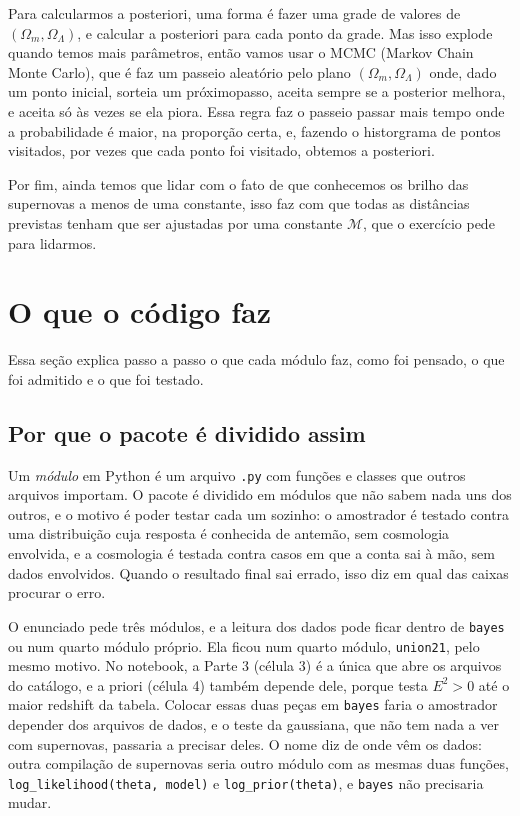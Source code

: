 \documentclass[11pt,a4paper]{article}
\newcommand{\M}{\mathcal{M}}
\begin{document}
Para calcularmos a posteriori, uma forma é fazer uma grade de valores de $(\Omega_m, \Omega_\Lambda)$, e calcular a posteriori para cada ponto da grade. 
Mas isso explode quando temos mais parâmetros, então vamos usar o MCMC (Markov Chain Monte Carlo), 
que é faz um passeio aleatório pelo plano $(\Omega_m, \Omega_\Lambda)$ onde, dado um ponto inicial, 
sorteia um próximopasso, aceita sempre se a posterior melhora, e aceita só às vezes se ela piora. 
Essa regra faz o passeio passar mais tempo onde a probabilidade é maior, na proporção certa, 
e, fazendo o historgrama de pontos visitados, por vezes que cada ponto foi visitado, obtemos a posteriori.

Por fim, ainda temos que lidar com o fato de que conhecemos os brilho das supernovas a menos de uma constante, isso faz com que todas as
distâncias previstas tenham que ser ajustadas por uma constante $\M$, que o exercício pede para lidarmos.

\section{O que o código faz}

Essa seção explica passo a passo o que cada módulo faz, como foi pensado, o que foi admitido e o que foi testado.

\subsection{Por que o pacote é dividido assim}

Um \emph{módulo} em Python é um arquivo \texttt{.py} com funções e classes que
outros arquivos importam. O pacote é dividido em módulos que não sabem nada uns
dos outros, e o motivo é poder testar cada um sozinho: o amostrador é testado
contra uma distribuição cuja resposta é conhecida de antemão, sem cosmologia
envolvida, e a cosmologia é testada contra casos em que a conta sai à mão, sem
dados envolvidos. Quando o resultado final sai errado, isso diz em qual das
caixas procurar o erro.

O enunciado pede três módulos, e a leitura dos dados pode ficar dentro de
\texttt{bayes} ou num quarto módulo próprio. Ela ficou num quarto módulo,
\texttt{union21}, pelo mesmo motivo. No notebook, a Parte 3 (célula 3)
é a única que abre os arquivos do catálogo, e a priori (célula 4) também depende
dele, porque testa $E^2 > 0$ até o maior redshift da tabela. Colocar essas duas
peças em \texttt{bayes} faria o amostrador depender dos arquivos de dados, e o
teste da gaussiana, que não tem nada a ver com supernovas, passaria a precisar
deles. O nome diz de onde vêm os dados: outra compilação de supernovas seria
outro módulo com as mesmas duas funções, \texttt{log\_likelihood(theta, model)}
e \texttt{log\_prior(theta)}, e \texttt{bayes} não precisaria mudar.
\end{document}
